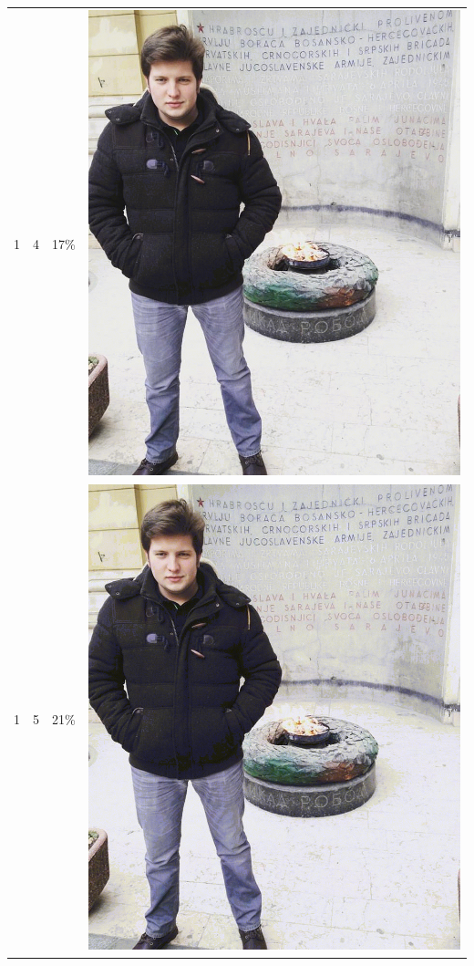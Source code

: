 \documentclass[times, utf8, seminar]{fer}
\begin{document}
\begin{center}
\begin{longtable}{|c|c|c|c|}
1 & 4 &17\% & \includegraphics[scale=0.3]{../benchmark_results/pattern/1_components-4_bits.png} \\
1 & 5 &21\% & \includegraphics[scale=0.3]{../benchmark_results/pattern/1_components-5_bits.png} \\

\end{longtable}
\end{center}
\end{document}
